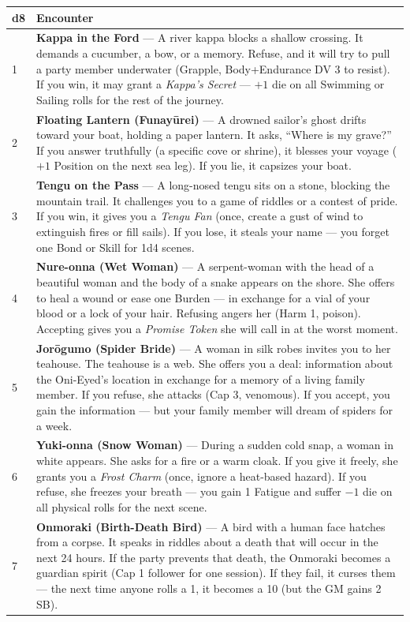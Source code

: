 \begin{longtable}{|p{1.5cm}|p{10cm}|}
\hline
\rowcolor{gray!20}
\textbf{d8} & \textbf{Encounter} \\
\hline
1 & \textbf{Kappa in the Ford} --- A river kappa blocks a shallow crossing. It demands a cucumber, a bow, or a memory. Refuse, and it will try to pull a party member underwater (Grapple, Body+Endurance DV 3 to resist). If you win, it may grant a \textit{Kappa's Secret} --- $+1$ die on all Swimming or Sailing rolls for the rest of the journey. \\
\hline
2 & \textbf{Floating Lantern (Funay{\=u}rei)} --- A drowned sailor's ghost drifts toward your boat, holding a paper lantern. It asks, ``Where is my grave?'' If you answer truthfully (a specific cove or shrine), it blesses your voyage ($+1$ Position on the next sea leg). If you lie, it capsizes your boat. \\
\hline
3 & \textbf{Tengu on the Pass} --- A long-nosed tengu sits on a stone, blocking the mountain trail. It challenges you to a game of riddles or a contest of pride. If you win, it gives you a \textit{Tengu Fan} (once, create a gust of wind to extinguish fires or fill sails). If you lose, it steals your name --- you forget one Bond or Skill for 1d4 scenes. \\
\hline
4 & \textbf{Nure-onna (Wet Woman)} --- A serpent-woman with the head of a beautiful woman and the body of a snake appears on the shore. She offers to heal a wound or ease one Burden --- in exchange for a vial of your blood or a lock of your hair. Refusing angers her (Harm 1, poison). Accepting gives you a \textit{Promise Token} she will call in at the worst moment. \\
\hline
5 & \textbf{Jor{\=o}gumo (Spider Bride)} --- A woman in silk robes invites you to her teahouse. The teahouse is a web. She offers you a deal: information about the Oni-Eyed's location in exchange for a memory of a living family member. If you refuse, she attacks (Cap 3, venomous). If you accept, you gain the information --- but your family member will dream of spiders for a week. \\
\hline
6 & \textbf{Yuki-onna (Snow Woman)} --- During a sudden cold snap, a woman in white appears. She asks for a fire or a warm cloak. If you give it freely, she grants you a \textit{Frost Charm} (once, ignore a heat-based hazard). If you refuse, she freezes your breath --- you gain 1 Fatigue and suffer $-1$ die on all physical rolls for the next scene. \\
\hline
7 & \textbf{Onmoraki (Birth-Death Bird)} --- A bird with a human face hatches from a corpse. It speaks in riddles about a death that will occur in the next 24 hours. If the party prevents that death, the Onmoraki becomes a guardian spirit (Cap 1 follower for one session). If they fail, it curses them --- the next time anyone rolls a 1, it becomes a 10 (but the GM gains 2 SB). \\

\end{longtable}
